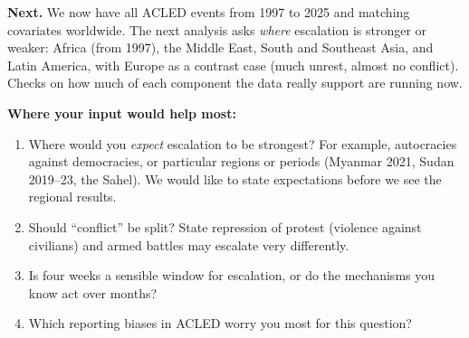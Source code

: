 \documentclass[10.5pt]{article}
\begin{document}
\textbf{Next.} We now have all ACLED events from 1997 to 2025 and matching covariates worldwide. The
next analysis asks \emph{where} escalation is stronger or weaker: Africa (from 1997), the Middle East,
South and Southeast Asia, and Latin America, with Europe as a contrast case (much unrest, almost no
conflict). Checks on how much of each component the data really support are running now.

\textbf{Where your input would help most:}
\begin{enumerate}
\item Where would you \emph{expect} escalation to be strongest? For example, autocracies against
democracies, or particular regions or periods (Myanmar 2021, Sudan 2019--23, the Sahel). We would
like to state expectations before we see the regional results.
\item Should ``conflict'' be split? State repression of protest (violence against civilians) and
armed battles may escalate very differently.
\item Is four weeks a sensible window for escalation, or do the mechanisms you know act over months?
\item Which reporting biases in ACLED worry you most for this question?
\end{enumerate}
\end{document}
